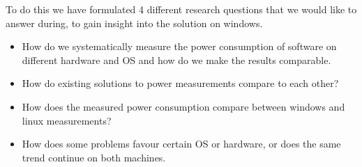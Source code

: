 To do this we have formulated 4 different research questions that we would like to answer during, to gain insight into the solution on windows.

\begin{itemize}
    \item How do we systematically measure the power consumption of software on different hardware and OS and how do we make the results comparable.
    \item How do existing solutions to power measurements compare to each other?
    \item How does the measured power consumption compare between windows and linux measurements?
    \item How does some problems favour certain OS or hardware, or does the same trend continue on both machines.
\end{itemize}



